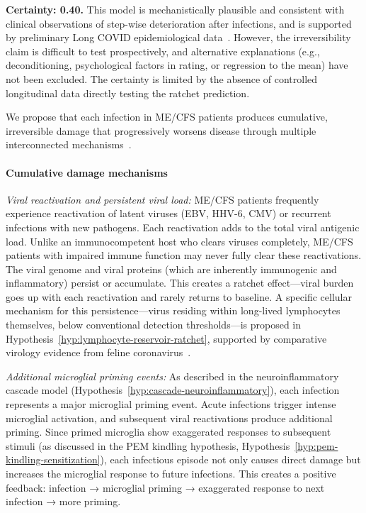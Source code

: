 \begin{speculation}
\label{spec:infection-damage-ratchet}

\textbf{Certainty: 0.40.} This model is mechanistically plausible and consistent with clinical observations of step-wise deterioration after infections, and is supported by preliminary Long COVID epidemiological data~\cite{PNAS2025MECFSLongCOVID}. However, the irreversibility claim is difficult to test prospectively, and alternative explanations (e.g., deconditioning, psychological factors in rating, or regression to the mean) have not been excluded. The certainty is limited by the absence of controlled longitudinal data directly testing the ratchet prediction.

We propose that each infection in ME/CFS patients produces cumulative, irreversible damage that progressively worsens disease through multiple interconnected mechanisms~\cite{PNAS2025MECFSLongCOVID}.

\paragraph{Cumulative damage mechanisms}

\textit{Viral reactivation and persistent viral load:} ME/CFS patients frequently experience reactivation of latent viruses (EBV, HHV-6, CMV) or recurrent infections with new pathogens. Each reactivation adds to the total viral antigenic load. Unlike an immunocompetent host who clears viruses completely, ME/CFS patients with impaired immune function may never fully clear these reactivations. The viral genome and viral proteins (which are inherently immunogenic and inflammatory) persist or accumulate. This creates a ratchet effect---viral burden goes up with each reactivation and rarely returns to baseline. A specific cellular mechanism for this persistence---virus residing within long-lived lymphocytes themselves, below conventional detection thresholds---is proposed in Hypothesis~\ref{hyp:lymphocyte-reservoir-ratchet}, supported by comparative virology evidence from feline coronavirus~\cite{Kol2026fipv}.

\textit{Additional microglial priming events:} As described in the neuroinflammatory cascade model (Hypothesis~\ref{hyp:cascade-neuroinflammatory}), each infection represents a major microglial priming event. Acute infections trigger intense microglial activation, and subsequent viral reactivations produce additional priming. Since primed microglia show exaggerated responses to subsequent stimuli (as discussed in the PEM kindling hypothesis, Hypothesis~\ref{hyp:pem-kindling-sensitization}), each infectious episode not only causes direct damage but increases the microglial response to future infections. This creates a positive feedback: infection → microglial priming → exaggerated response to next infection → more priming.


\end{speculation}
